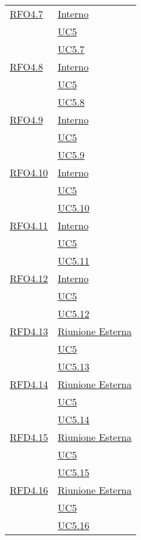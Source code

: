 \begin{longtable}{|>{\centering}m{5cm}|m{5cm}<{\centering}|}
\hyperlink{RFO4.7}{RFO4.7} & \hyperlink{Interno}{Interno}\\
& \hyperref[UC5]{UC5}\\
& \hyperref[UC5.7]{UC5.7}\\ \hline

\hyperlink{RFO4.8}{RFO4.8} & \hyperlink{Interno}{Interno}\\
& \hyperref[UC5]{UC5}\\
& \hyperref[UC5.8]{UC5.8}\\ \hline

\hyperlink{RFO4.9}{RFO4.9} & \hyperlink{Interno}{Interno}\\
& \hyperref[UC5]{UC5}\\
& \hyperref[UC5.9]{UC5.9}\\ \hline

\hyperlink{RFO4.10}{RFO4.10} & \hyperlink{Interno}{Interno}\\
& \hyperref[UC5]{UC5}\\
& \hyperref[UC5.10]{UC5.10}\\ \hline

\hyperlink{RFO4.11}{RFO4.11} & \hyperlink{Interno}{Interno}\\
& \hyperref[UC5]{UC5}\\
& \hyperref[UC5.11]{UC5.11}\\ \hline

\hyperlink{RFO4.12}{RFO4.12} & \hyperlink{Interno}{Interno}\\
& \hyperref[UC5]{UC5}\\
& \hyperref[UC5.12]{UC5.12}\\ \hline

\hyperlink{RFD4.13}{RFD4.13} & \hyperlink{Riunione Esterna}{Riunione Esterna}\\
& \hyperref[UC5]{UC5}\\
& \hyperref[UC5.13]{UC5.13}\\ \hline

\hyperlink{RFD4.14}{RFD4.14} & \hyperlink{Riunione Esterna}{Riunione Esterna}\\
& \hyperref[UC5]{UC5}\\
& \hyperref[UC5.14]{UC5.14}\\ \hline

\hyperlink{RFD4.15}{RFD4.15} & \hyperlink{Riunione Esterna}{Riunione Esterna}\\
& \hyperref[UC5]{UC5}\\
& \hyperref[UC5.15]{UC5.15}\\ \hline

\hyperlink{RFD4.16}{RFD4.16} & \hyperlink{Riunione Esterna}{Riunione Esterna}\\
& \hyperref[UC5]{UC5}\\
& \hyperref[UC5.16]{UC5.16}\\ \hline


\end{longtable}
